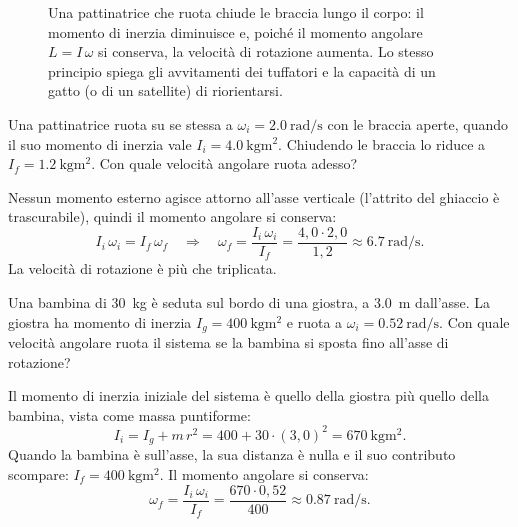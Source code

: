 \begin{figure}[!htbp]
    \centering
    \caption{Una pattinatrice che ruota chiude le braccia lungo il corpo: il momento di inerzia diminuisce e, poiché il momento angolare $L = I\,\omega$ si conserva, la velocità di rotazione aumenta. Lo stesso principio spiega gli avvitamenti dei tuffatori e la capacità di un gatto (o di un satellite) di riorientarsi.}
    \label{fig:pattinatrice}
\end{figure}

\begin{testexample}
Una pattinatrice ruota su se stessa a $\omega_i = \SI{2,0}{\radian\per\second}$ con le braccia aperte, quando il suo momento di inerzia vale $I_i = \SI{4,0}{\kilogram\metre\squared}$. Chiudendo le braccia lo riduce a $I_f = \SI{1,2}{\kilogram\metre\squared}$. Con quale velocità angolare ruota adesso?

Nessun momento esterno agisce attorno all'asse verticale (l'attrito del ghiaccio è trascurabile), quindi il momento angolare si conserva:
\[ I_i\,\omega_i = I_f\,\omega_f \quad\Rightarrow\quad \omega_f = \frac{I_i\,\omega_i}{I_f} = \frac{4{,}0 \cdot 2{,}0}{1{,}2} \approx \SI{6,7}{\radian\per\second}. \]
La velocità di rotazione è più che triplicata.
\end{testexample}

\begin{testexample}
Una bambina di \SI{30}{\kilogram} è seduta sul bordo di una giostra, a \SI{3,0}{\metre} dall'asse. La giostra ha momento di inerzia $I_g = \SI{400}{\kilogram\metre\squared}$ e ruota a $\omega_i = \SI{0,52}{\radian\per\second}$. Con quale velocità angolare ruota il sistema se la bambina si sposta fino all'asse di rotazione?

Il momento di inerzia iniziale del sistema è quello della giostra più quello della bambina, vista come massa puntiforme:
\[ I_i = I_g + m\,r^2 = 400 + 30 \cdot (3{,}0)^2 = \SI{670}{\kilogram\metre\squared}. \]
Quando la bambina è sull'asse, la sua distanza è nulla e il suo contributo scompare: $I_f = \SI{400}{\kilogram\metre\squared}$. Il momento angolare si conserva:
\[ \omega_f = \frac{I_i\,\omega_i}{I_f} = \frac{670 \cdot 0{,}52}{400} \approx \SI{0,87}{\radian\per\second}. \]
\end{testexample}

